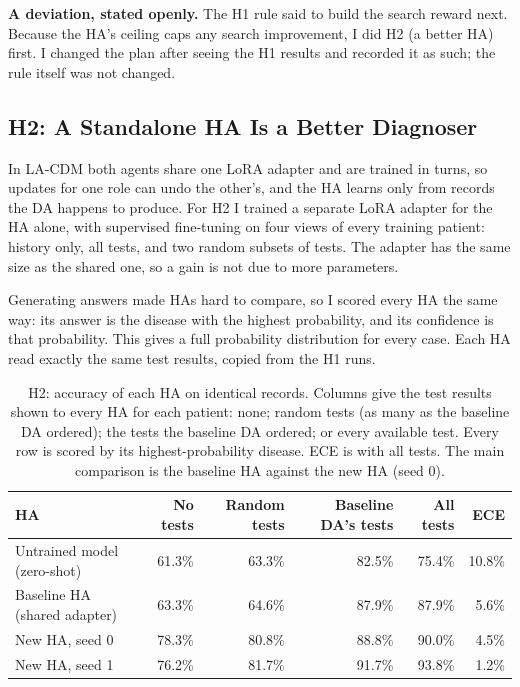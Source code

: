 \documentclass[11pt]{article}
\begin{document}
\textbf{A deviation, stated openly.} The H1 rule said to build the search reward
next. Because the HA's ceiling caps any search improvement, I did H2 (a better
HA) first. I changed the plan after seeing the H1 results and recorded it as
such; the rule itself was not changed.

\subsection*{H2: A Standalone HA Is a Better Diagnoser}

In LA-CDM both agents share one LoRA adapter and are trained in turns, so
updates for one role can undo the other's, and the HA learns only from records
the DA happens to produce. For H2 I trained a separate LoRA adapter for the HA
alone, with supervised fine-tuning on four views of every training patient:
history only, all tests, and two random subsets of tests. The adapter has the
same size as the shared one, so a gain is not due to more parameters.

Generating answers made HAs hard to compare, so I scored every HA the same way:
its answer is the disease with the highest probability, and its confidence is
that probability. This gives a full probability distribution for every case.
Each HA read exactly the same test results, copied from the H1 runs.

\begin{table}[ht]
  \centering
  \caption{H2: accuracy of each HA on identical records. Columns give the test
  results shown to every HA for each patient: none; random tests (as many as the
  baseline DA ordered); the tests the baseline DA ordered; or every available
  test. Every row is scored by its highest-probability disease. ECE is with all
  tests. The main comparison is the baseline HA against the new HA (seed 0).}
  \label{tab:h2}
  \small
  \begin{tabular}{lrrrrr}
    \toprule
    HA & No tests & Random tests & Baseline DA's tests & All tests & ECE \\
    \midrule
    Untrained model (zero-shot) & 61.3\% & 63.3\% & 82.5\% & 75.4\% & 10.8\% \\
    Baseline HA (shared adapter) & 63.3\% & 64.6\% & 87.9\% & 87.9\% & 5.6\% \\
    New HA, seed 0 & 78.3\% & 80.8\% & 88.8\% & 90.0\% & 4.5\% \\
    New HA, seed 1 & 76.2\% & 81.7\% & 91.7\% & 93.8\% & 1.2\% \\
    \bottomrule
  \end{tabular}
\end{table}
\end{document}
